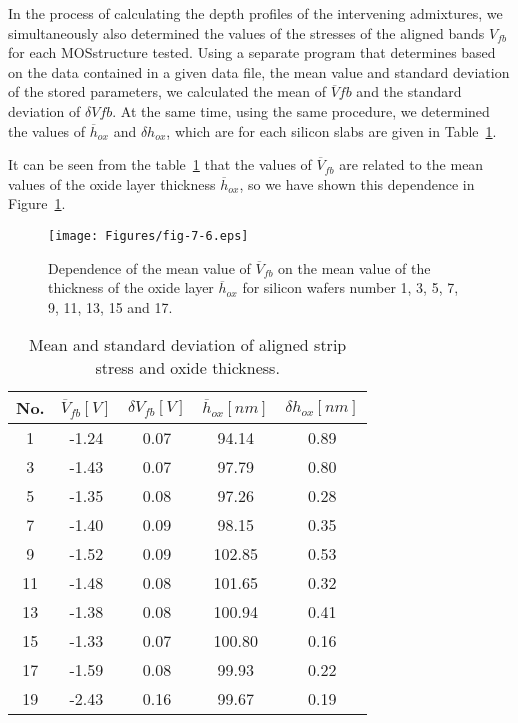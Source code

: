 In the process of calculating the depth profiles of the intervening
admixtures, we simultaneously also determined the values of the
stresses of the aligned bands $V_{fb}$ for each MOS\@ structure
tested. Using a separate program that determines based on the data
contained in a given data file, the mean value and standard deviation
of the stored parameters, we calculated the mean of $\overline V{fb}$
and the standard deviation of $\delta V{fb}$. At the same time, using
the same procedure, we determined the values of $\overline h_{ox}$ and
$\delta h_{ox}$, which are for each silicon slabs are given in
Table~\ref{tab:7.4}.

It can be seen from the table~\ref{tab:7.4} that the values of
$\overline V_{fb}$ are related to the mean values of the oxide layer
thickness $\overline h_{ox}$, so we have shown this dependence in
Figure~\ref{fig:7.6}.

\newpage
\begin{figure}[h!]\centering
  \texttt{[image: Figures/fig-7-6.eps]}
  \caption[Dependence of the mean value of $\overline V_{fb}$ on the
    mean value of the oxide layer thickness $\overline
    h_{ox}$]{Dependence of the mean value of $\overline V_{fb}$ on the
    mean value of the thickness of the oxide layer $\overline h_{ox}$
    for silicon wafers number 1, 3, 5, 7, 9, 11, 13, 15 and
    17.}\label{fig:7.6}
\end{figure}

\begin{table}[h!]\centering
  \begin{tabular}{c c c c c}
    No. & $\overline V_{fb} [V]$ & $\delta V_{fb} [V]$ & $\overline h_{ox} [nm]$ & $\delta h_{ox} [nm]$\\
    \hline
    1 & -1.24 & 0.07 & 94.14 & 0.89\\
    3 & -1.43 & 0.07 & 97.79 & 0.80\\
    5 & -1.35 & 0.08 & 97.26 & 0.28\\
    7 & -1.40 & 0.09 & 98.15 & 0.35\\
    9 & -1.52 & 0.09 & 102.85 & 0.53\\
    11 & -1.48 & 0.08 & 101.65 & 0.32\\
    13 & -1.38 & 0.08 & 100.94 & 0.41\\
    15 & -1.33 & 0.07 & 100.80 & 0.16\\
    17 & -1.59 & 0.08 & 99.93 & 0.22\\
    19 & -2.43 & 0.16 & 99.67 & 0.19\\
  \end{tabular}
  \caption[Mean and standard deviation of the voltage of the aligned
    strips and oxide thickness]{Mean and standard deviation of aligned
    strip stress and oxide thickness.}\label{tab:7.4}
\end{table}

